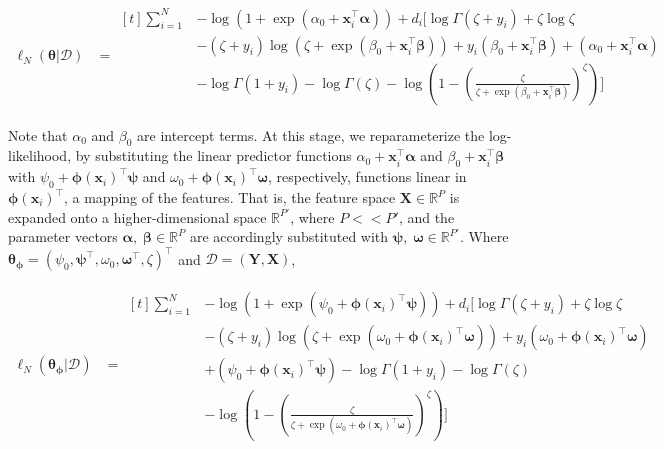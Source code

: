 \documentclass[12pt]{article}
\newcommand{\X}{\mathbf{X}}
\newcommand{\x}{\mathbf{x}}
\newcommand{\Y}{\mathbf{Y}}
\renewcommand{\r}{\right}
\renewcommand{\l}{\left}
\newcommand{\bomega}{\bm{\omega}}
\newcommand{\bpsi}{\bm{\psi}}
\newcommand{\bbeta}{\bm{\beta}}
\newcommand{\balpha}{\bm{\alpha}}
\newcommand{\bphi}{\bm{\phi}}
\newcommand{\btheta}{\bm{\theta}}
\begin{document}
\begin{align}
  \ell_N(\btheta | \mathcal{D}) &= \begin{aligned}[t]
    \sum^N_{i=1} & - \log \l(1 + \exp(\alpha_0 + \x^\top_i \balpha) \r) +  d_i \Bigg[ \log \Gamma( \zeta + y_i ) + \zeta \log \zeta \\
    &- (\zeta + y_i) \log \l( \zeta + \exp(\beta_0 + \x^\top_i \bbeta) \r) + y_i(\beta_0 + \x^\top_i \bbeta) + (\alpha_0 + \x^\top_i \balpha) \\
    & - \log \Gamma (1 + y_i) - \log \Gamma (\zeta) - \log \l( 1 - \l( \frac{\zeta}{\zeta + \exp(\beta_0 + \x^\top_i \bbeta)} \r)^\zeta \r) \Bigg]
  \end{aligned} \label{eq:sampll}
\end{align} 

Note that $\alpha_0$ and $\beta_0$ are intercept terms. At this stage, we reparameterize the log-likelihood, by substituting the linear predictor functions $\alpha_0 + \x_i^\top\balpha$ and $\beta_0 + \x_i^\top\bbeta$ with $\psi_0 + \bphi(\x_i)^\top\bpsi$ and $\omega_0 + \bphi(\x_i)^\top\bomega$, respectively, functions linear in $\bphi(\x_i)^\top$, a mapping of the features. That is, the feature space $\X \in \mathbb{R}^P$ is expanded onto a higher-dimensional space $\mathbb{R}^{P'}$, where $P<<P' $, and the parameter vectors $\balpha, \; \bbeta \in \mathbb{R}^P$ are accordingly substituted with $\bpsi, \; \bomega \in \mathbb{R}^{P'}$. Where $\btheta_{\bphi} = (\psi_0, \bpsi^\top, \omega_0, \bomega^\top, \zeta)^\top$ and $\mathcal{D} = (\Y, \X)$,

\begin{align}
\label{eq:finalll}
  \ell_N(\btheta_{\bphi} | \mathcal{D}) &= \begin{aligned}[t]
    \sum^N_{i=1} & - \log \l(1 + \exp(\psi_0 + \bphi(\x_i)^\top \bpsi) \r) +  d_i \Bigg[ \log \Gamma( \zeta + y_i ) + \zeta \log \zeta \\
    & - (\zeta + y_i) \log \l( \zeta + \exp(\omega_0 + \bphi(\x_i)^\top \bomega) \r) + y_i(\omega_0 + \bphi(\x_i)^\top \bomega) \\
    & + (\psi_0 + \bphi(\x_i)^\top \bpsi) - \log \Gamma (1 + y_i) - \log \Gamma (\zeta) \\
    & - \log \l( 1 - \l( \frac{\zeta}{\zeta + \exp(\omega_0 + \bphi(\x_i)^\top \bomega)} \r)^\zeta \r) \Bigg]
  \end{aligned}
\end{align} 
\end{document}

